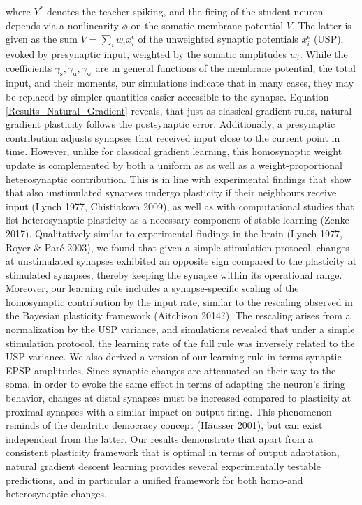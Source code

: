 \documentclass[12pt]{article}
\newcommand{\mrm}{\mathrm}
\begin{document}
where $Y^*$ denotes the teacher spiking, and the firing of the student neuron depends via a nonlinearity $\phi$ on the somatic membrane potential $V$. The latter is given as the sum $V=\sum_i w_i x_i^{\epsilon}$ of the unweighted synaptic potentials $x_i^{\epsilon}$ (USP), evoked by presynaptic input, weighted by the somatic amplitudes $w_i$. While the coefficients $\gamma_{\mrm s},\gamma_{\mrm u},\gamma_{\mrm w}$ are in general functions of the membrane potential, the total input, and their moments, our simulations indicate that in many cases, they may be replaced by simpler quantities easier accessible to the synapse. Equation \ref{Results_Natural_Gradient} reveals, that just as classical gradient rules, natural gradient plasticity follows the postsynaptic error. Additionally, a presynaptic contribution adjusts synapses that received input close to the current point in time. However, unlike for classical gradient learning, this homosynaptic weight update is complemented by both a uniform as as well as a weight-proportional heterosynaptic contribution. This is in line with experimental findings that show that also unstimulated synapses undergo plasticity if their neighbours receive input (Lynch 1977, Chistiakova 2009), as well as with computational studies that list heterosynaptic plasticity as a necessary component of stable learning (Zenke 2017). Qualitatively similar to experimental findings in the brain (Lynch 1977, Royer \& Paré 2003), we found that given a simple stimulation protocol, changes at unstimulated synapses exhibited an opposite sign compared to the plasticity at stimulated synapses, thereby keeping the synapse within its operational range.
Moreover, our learning rule includes a synapse-specific scaling of the homosynaptic contribution by the input rate, similar to the rescaling observed in the Bayesian plasticity framework (Aitchison 2014?). The rescaling arises from a normalization by the USP variance, and simulations revealed that under a simple stimulation protocol, the learning rate of the full rule was inversely related to the USP variance.
We also derived a version of our learning rule in terms synaptic EPSP amplitudes. Since synaptic changes are attenuated on their way to the soma, in order to evoke the same effect in terms of adapting the neuron's firing behavior, changes at distal synapses must be increased compared to plasticity at proximal synapses with a similar impact on output firing. This phenomenon reminds of the dendritic democracy concept (Häusser 2001), but can exist independent from the latter. Our results demonstrate that apart from a consistent plasticity framework that is optimal in terms of output adaptation, natural gradient descent learning provides several experimentally testable predictions, and in particular a unified framework for both homo-and heterosynaptic changes.
\end{document}
